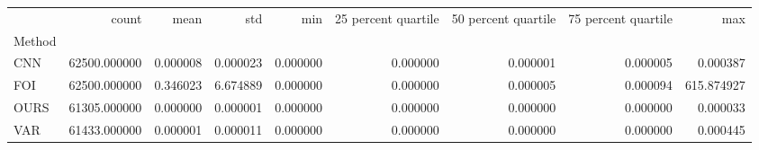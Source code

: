 \begin{tabular}{lrrrrrrrr}
 & count & mean & std & min & 25 percent quartile & 50 percent quartile & 75 percent quartile & max \\
Method &  &  &  &  &  &  &  &  \\
CNN & 62500.000000 & 0.000008 & 0.000023 & 0.000000 & 0.000000 & 0.000001 & 0.000005 & 0.000387 \\
FOI & 62500.000000 & 0.346023 & 6.674889 & 0.000000 & 0.000000 & 0.000005 & 0.000094 & 615.874927 \\
OURS & 61305.000000 & 0.000000 & 0.000001 & 0.000000 & 0.000000 & 0.000000 & 0.000000 & 0.000033 \\
VAR & 61433.000000 & 0.000001 & 0.000011 & 0.000000 & 0.000000 & 0.000000 & 0.000000 & 0.000445 \\
\end{tabular}
